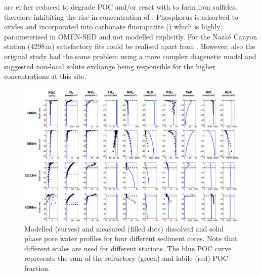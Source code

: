 \documentclass[gmd, manuscript]{copernicus}
\begin{document}
are either reduced to degrade POC and/or react with  to form iron sulfides, therefore inhibiting the rise in concentration of  \citep{reimers_porewater_1996}. 
Phosphorus is adsorbed to  oxides and incorporated into carbonate fluorapatite () which is highly parameterised in OMEN-SED and not modelled explicitly.  
For the Naza\'e Canyon station (4298\,m) satisfactory fits could be realised apart from . However, also the original study \citep{epping_oxidation_2002} had the same problem using a more 
complex diagenetic model and suggested non-local solute exchange being responsible for the higher  concentrations at this site.

\begin{figure}
	\includegraphics[width=1.0\textwidth]{figures/Profiles/0_ALL_PROFILES_COMBINED_1503.pdf}
	\caption{Modelled (curves) and measured (filled dots) dissolved and solid phase pore water profiles for four different sediment cores. Note that different 
	scales are used for different stations. The blue POC curve represents the sum of the refractory (green) and labile (red) POC fraction.}
	\label{fig:Sediment_profiles}
\end{figure}
\end{document}
